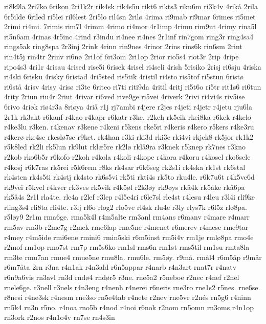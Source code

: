 ri8k9la
2ri7ko
6rikon
2ri1k2r
rik4sk
rik4s5u
rikt6
rikts3
riku6m
ri3k4v
4rik^^e5
2rila
6r5ilde
6riled
ri5lei
ril6lest
2ri5lo
ril4sn
2ril^^f8
4rima
ri9mab
ri9mar
6rimes
ri5met
2rimi
ri4mi.
7rimis
rim7l
4rimm
4rimo
ri4mor
4r1imp
4rimu
rim9ut
4rimy
rina5l
ri5n6am
4rinas
4r5inc
4rind
r3indu
ri4nee
ri4nes
2r1inf
rin7gom
ring3r
ring4sa4
rings5ak
ring8spa
2r3inj
2rink
4rinn
rin9nes
4rinor
2rins
rins6k
rin6sm
2rint
rin4t5j
rin4tr
2rinv
ri6n^^f8
2ri1of
6ri3om
2ri1op
2rior
rio5s4
riot3r
2rip
4ripe
ripo4s3
4ri1r
4risau
4rised
rise5i
6risek
4risel
ri4seli
4rish
5risiko
2risj
ri6sju
4riska
ri4ski
6risku
4risky
6ristad
4ri5sted
ris5tik
4ristil
ri4sto
ris5tof
ri5stun
6rist^^f8
ri6st^^e5
4risv
4risy
4ris^^f8
ri3te
6riteo
ri7ti
riti9da
4ritil
4ritj
ri5t6o
ri5tr
rit1s6
ri6tun
4rity
2riun
riu4r
2riut
4rivar
ri6ved
rive9ge
ri5vei
4riverk
2rivi
ri4vi4s
riv5ise
6rivo
4ri^^f8k
ri^^f84r3a
8ri^^f8ya
4ri^^e5
r1j
rj7ambi
r4jere
r2jes
r4jeti
r4jetr
r4jetu
rju6la
2r1k
rk3akt
r6kanf
r4kao
r4kapr
r6katr
r3ke.
r2keh
rk5eik
rkei8ka
r6kek
r4kelo
r4ke3lu
r3ken.
r4kenav
r3kene
r4keni
r5kens
rke5ri
r4keris
r4kero
r5kers
r4ke3ru
r4ker^^f8
rke4se
rkesl^^f87se
r9ket.
rk4han
r3ki
rki3d
rki3e
rki4vi
rkjek8
rk5jor
rk1k2
r5k8led
rk2li
rk5lun
rk9lut
rkl^^e65re
rk2l^^f8
rkl^^e59ra
r3knek
r5knep
rk7nes
r3kno
r2kob
rko6b5r
r6kofo
r2koh
r4kola
r4koli
r4kope
r4kora
r4koru
r4kosel
rko6sele
r4kosj
r6k7ras
rk5rei
r5k6rem
r8ks
rk4sar
r6k6seg
rk2s1i
rk4ska
rk1st
rk6stal
rk4sten
rk4s5ti
rk4stj
rk4sto
rk6s5vi
rk5ti
rkti4s
rk5to
rku4le.
r6k7u6t
r4k5ve6d
rk9vei
r5kvel
r4kver
rk3ves
rk5vik
r4k5^^f8l
r2k3^^f8y
rk9^^f8ys
rk^^e54k
rk5^^e5ke
rk^^e56pa
rk5^^e54s
2r1l
rla4te.
rle4a
r2lef
r3lep
r4l5e4ri
r6le7sl
rle4st
r4lesu
r4leu
r3l4i
rli9ke
rling3s4
rli8ta
rli4te.
r3lj
rl6o
rlog2
rlo5ve
rl4sk
rlu4e
r3ly
rlys7k
r6l5z
rl^^f88pa.
r5l^^f8y9
2r1m
rma6ge.
rma5k4l
r4m5alte
rm3anl
rm4ans
r6manv
r4mare
r4marr
rm5av
rm3b
r2me7g
r2mek
rme6lap
rme5ne
r4menet
r6merev
r4mese
rme9tar
r4mey
r4m5ide
rmi6ene
rmini6
rmin5ski
r6m5inst
rm5i4v
rm1je
rml^^f88pa
rmo4e
r2mof
rm1op
rmo7st
rm7p
rm5s6ko
rm1sl
rms6n
rm1st
rms5til
rm1su
rmta8la
rm3te
rmu7an
rmue4
rmue5ne
rmu8la.
rmu6le.
rm5^^f8y.
r9m^^e5.
rm^^e5l4
r6m5^^e5p
r9m^^e5r
r6m7^^e5ta
2rn
r3na
r4n1ak
r4n3ald
r6n5appar
r4narb
r4n3art
rnat7r
r4natv
r6n9a6vis
rn3avl
rn3d
rnd^^f84
rnd^^f8r5
r3ne.
rne5a2
r5neboe
r2nec
r4nef
r2nel
rnele6ge.
r3nell
r3nels
r4n3eng
r4nenh
r4nerei
r6neris
rne3ro
rne1s2
r5nes.
rne6se.
r8nesi
r4ne3sk
r4nesm
rne3so
rn5e4tab
r4nete
r2nev
rne5vr
r2n^^e9s
rn5g6
r4ninn
rn5k4
rn3n
r5no.
r4noa
rno5b
r4nod
r4noi
r6nok
r2nom
rn5omn
rn3oms
r4n1op
rn3ork
r2nos
r4n1o4v
rn7se
rn4s3in
